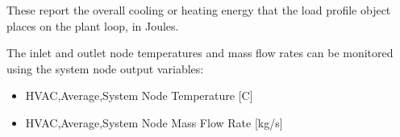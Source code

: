 These report the overall cooling or heating energy that the load profile object places on the plant loop, in Joules.

The inlet and outlet node temperatures and mass flow rates can be monitored using the system node output variables:

\begin{itemize}
\item
  HVAC,Average,System Node Temperature {[}C{]}
\item
  HVAC,Average,System Node Mass Flow Rate {[}kg/s{]}
\end{itemize}

